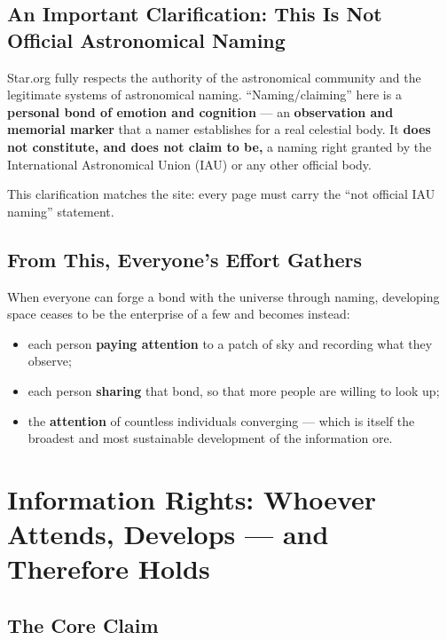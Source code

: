 \documentclass[11pt,fontset=none]{ctexart}
\begin{document}
\subsection{An Important Clarification: This Is Not Official Astronomical Naming}

Star.org fully respects the authority of the astronomical community and the legitimate systems of astronomical naming. ``Naming/claiming'' here is a \textbf{personal bond of emotion and cognition} — an \textbf{observation and memorial marker} that a namer establishes for a real celestial body. It \textbf{does not constitute, and does not claim to be,} a naming right granted by the International Astronomical Union (IAU) or any other official body.

This clarification matches the site: every page must carry the ``not official IAU naming'' statement.

\subsection{From This, Everyone's Effort Gathers}

When everyone can forge a bond with the universe through naming, developing space ceases to be the enterprise of a few and becomes instead:

\begin{itemize}
  \item each person \textbf{paying attention} to a patch of sky and recording what they observe;
  \item each person \textbf{sharing} that bond, so that more people are willing to look up;
  \item the \textbf{attention} of countless individuals converging — which is itself the broadest and most sustainable development of the information ore.
\end{itemize}


\section{Information Rights: Whoever Attends, Develops — and Therefore Holds}

\subsection{The Core Claim}
\end{document}
